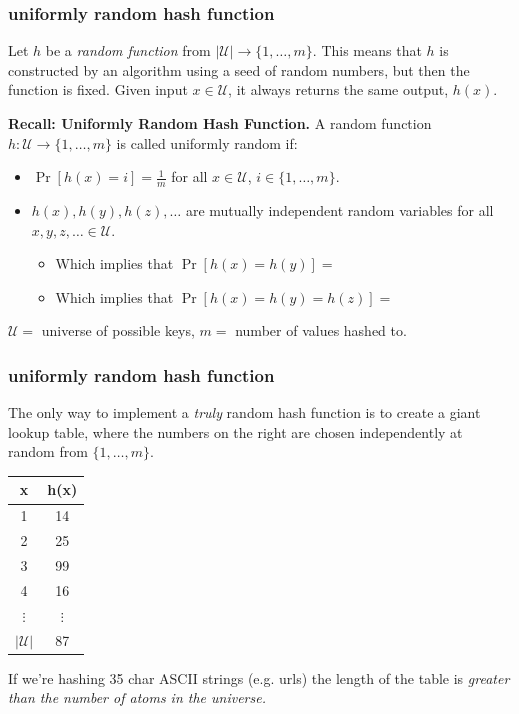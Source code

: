 \documentclass[handout,compress]{beamer}
\begin{document}
	\begin{frame}
		\frametitle{uniformly random hash function}
		Let $h$ be a \emph{random function} from $|\mathcal{U}| \rightarrow \{1,\ldots, m\}$. This means that $h$ is constructed by an algorithm using a seed of random numbers, but then the function is fixed. Given input $x\in \mathcal{U}$, it always returns the same output, $h(x)$. 
	
	\textbf{Recall: Uniformly Random Hash Function.} 
	A random function $h: \mathcal{U}\rightarrow \{1, \ldots, m\}$ is called uniformly random if:
	\begin{itemize}
		\item $\Pr[h(x) = i] = \frac{1}{m}$ for all $x\in \mathcal{U}$, $i\in \{1,\ldots, m\}$.  
		\vspace{.5em}
		\item $h(x), h(y), h(z), \ldots$ are mutually independent random variables for all $x,y,z, \ldots \in \mathcal{U}$. 
		\begin{itemize}
			\vspace{.5em}
			\item Which implies that $\Pr[h(x) = h(y)] = $ \vspace{2em}
			\item Which implies that $\Pr[h(x) = h(y) = h(z)] = $ 

		\end{itemize}
	\end{itemize}
	
	\vspace{2em}
	\begin{block}{\vspace*{-3ex}}
		\small $\mathcal{U} = $ universe of possible keys, $m=$ number of values hashed to.
	\end{block}
\end{frame}

	\begin{frame}[t]
	\frametitle{uniformly random hash function}
	\begin{center}
	The only way to implement a \emph{truly} random hash function is to create a giant lookup table, where the numbers on the right are chosen independently at random from $\{1, \ldots, m\}$. 
	
		\begin{tabular}{c | c } 
		x & h(x) \\
		\hline 
		1 & 14\\ 
		2 & 25\\ 
		3 & 99\\ 
		4 & 16\\ 
		$\vdots$ & $\vdots$\\
		$|\mathcal{U}|$ & 87
		\end{tabular}
	\end{center}
If we're hashing 35 char ASCII strings (e.g. urls) the length of the table is \emph{greater than the number of atoms in the universe.}
	\end{frame}
\end{document}
